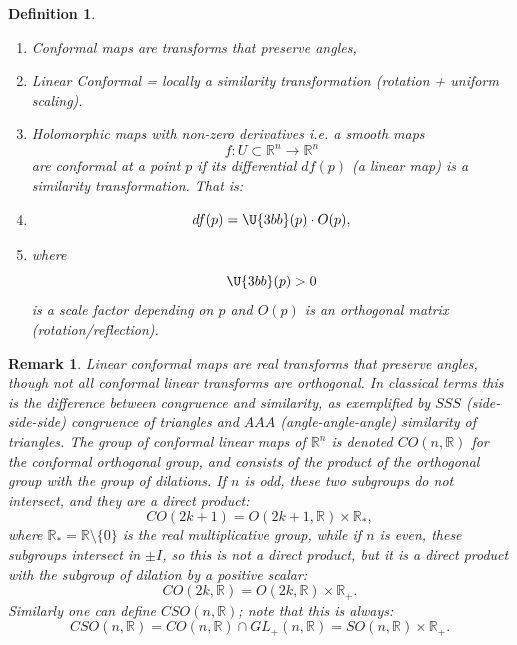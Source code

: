 \documentclass[aps,preprint]{revtex4}
\newtheorem{definition}[theorem]{Definition}
\newtheorem{remark}[theorem]{Remark}
\begin{document}
\begin{definition}
\begin{enumerate}
\item Conformal maps are transforms that preserve angles,

\item Linear Conformal = locally a similarity transformation (rotation +
uniform scaling).

\item Holomorphic maps with non-zero derivatives i.e. a smooth maps 
\begin{equation}
f:U\subset \mathbb{R}^{n}\rightarrow \mathbb{R}^{n}
\end{equation}%
are conformal at a point $p$ if its differential $df(p)$ (a linear map) is a
similarity transformation. That is:

\item 
\begin{equation}
df(p)=\U{3bb} (p)\cdot O(p),
\end{equation}

\item where%
\begin{equation}
\U{3bb} (p)>0
\end{equation}%
is a scale factor depending on $p$ and $O(p)$ is an orthogonal matrix
(rotation/reflection).
\end{enumerate}
\end{definition}

\begin{remark}
Linear conformal maps are real transforms that preserve angles, though not
all conformal linear transforms are orthogonal. In classical terms this is
the difference between \emph{congruence} and \emph{similarity}, as
exemplified by $SSS$ (side-side-side) \emph{congruence of triangles} and $%
AAA $ (angle-angle-angle) \emph{similarity of triangles}. The group of
conformal linear maps of $\mathbb{R}^{n}$ is denoted $CO(n,\mathbb{R})$ for
the conformal orthogonal group, and consists of the product of the
orthogonal group with the group of dilations. If $n$ is odd, these two
subgroups do not intersect, and they are a \emph{direct product}: 
\begin{equation}
CO(2k+1)=O(2k+1,\mathbb{R})\times \mathbb{R}_{\ast },
\end{equation}%
where $\mathbb{R}_{\ast }=\mathbb{R}\setminus \{0\}$ is the real
multiplicative group, while if $n$ is even, these subgroups intersect in $%
\pm I$, so this is not a direct product, but it is a direct product with the
subgroup of dilation by a positive scalar: 
\begin{equation}
CO(2k,\mathbb{R})=O(2k,\mathbb{R})\times \mathbb{R}_{+}.
\end{equation}%
Similarly one can define $CSO(n,\mathbb{R})$; note that this is always: 
\begin{equation}
CSO(n,\mathbb{R})=CO(n,\mathbb{R})\cap GL_{+}(n,\mathbb{R})=SO(n,\mathbb{R}%
)\times \mathbb{R}_{+}.
\end{equation}
\end{remark}
\end{document}
